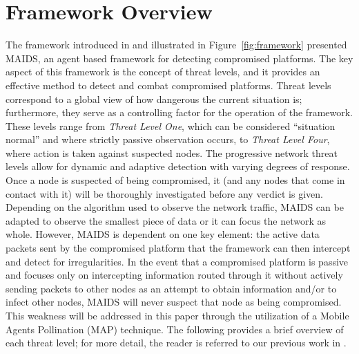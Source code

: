 \documentclass{acm_proc_article-sp}
\begin{document}
\section{Framework Overview}
The framework introduced in \cite{kackley09} and illustrated in Figure~\ref{fig:framework} presented MAIDS, an agent based framework for detecting compromised platforms.  The key aspect of this framework is the concept of threat levels, and it provides an effective method to detect and combat compromised platforms.  Threat levels correspond to a global view of how dangerous the current situation is; furthermore, they serve as a controlling factor for the operation of the framework.  These levels range from {\it Threat Level One}, which can be considered ``situation normal'' and where strictly passive observation occurs, to {\it Threat Level Four}, where action is taken against suspected nodes.  The progressive network threat levels allow for dynamic and adaptive detection with varying degrees of response.  Once a node is suspected of being compromised, it (and any nodes that come in contact with it) will be thoroughly investigated before any verdict is given.  Depending on the algorithm used to observe the network traffic, MAIDS can be adapted to observe the smallest piece of data or it can focus the network as whole.  However, MAIDS is dependent on one key element: the active data packets sent by the compromised platform that the framework can then intercept and detect for irregularities.  In the event that a compromised platform is passive and focuses only on intercepting information routed through it without actively sending packets to other nodes as an attempt to obtain information and/or to infect other nodes, MAIDS will never suspect that node as being compromised.  This weakness will be addressed in this paper through the utilization of a Mobile Agents Pollination (MAP) technique.  The following provides a brief overview of each threat level; for more detail, the reader is referred to our previous work in \cite{kackley09}.
\end{document}
